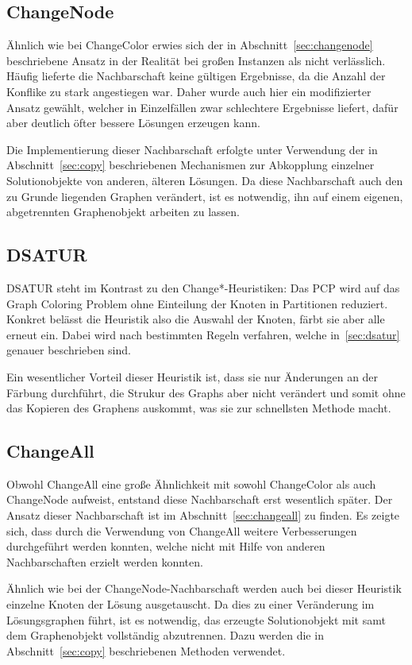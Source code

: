 \subsection{ChangeNode}
Ähnlich wie bei ChangeColor erwies sich der in Abschnitt~\ref{sec:changenode} beschriebene Ansatz in der Realität bei großen Instanzen als nicht verlässlich. Häufig lieferte die Nachbarschaft keine gültigen
Ergebnisse, da die Anzahl der Konflike zu stark angestiegen war. Daher wurde auch hier ein modifizierter Ansatz gewählt, welcher in Einzelfällen zwar schlechtere Ergebnisse liefert, dafür aber deutlich öfter
bessere Lösungen erzeugen kann.

Die Implementierung dieser Nachbarschaft erfolgte unter Verwendung der in Abschnitt~\ref{sec:copy} beschriebenen Mechanismen zur Abkopplung einzelner Solutionobjekte von anderen, älteren Lösungen. Da diese 
Nachbarschaft auch den zu Grunde liegenden Graphen verändert, ist es notwendig, ihn auf einem eigenen, abgetrennten Graphenobjekt arbeiten zu lassen. 

\subsection{DSATUR}
DSATUR steht im Kontrast zu den Change*-Heuristiken: Das PCP wird auf das Graph Coloring Problem ohne Einteilung der Knoten in Partitionen reduziert. Konkret belässt die Heuristik also die Auswahl der Knoten, färbt sie aber alle erneut ein. Dabei wird nach be\-stim\-mt\-en Regeln verfahren, welche in~\ref{sec:dsatur} genauer beschrieben sind.

Ein wesentlicher Vorteil dieser Heuristik ist, dass sie nur Änderungen an der Färbung durchführt, die Strukur des Graphs aber nicht verändert und somit ohne das Kopieren des Graphens auskommt, was sie zur schnellsten Methode macht.

\subsection{ChangeAll}
Obwohl ChangeAll eine große Ähnlichkeit mit sowohl ChangeColor als auch ChangeNode aufweist, entstand diese Nachbarschaft erst wesentlich später. Der Ansatz dieser Nachbarschaft ist im Abschnitt~\ref{sec:changeall} zu finden.
Es zeigte sich, dass durch die Verwendung von ChangeAll weitere Verbesserungen durchgeführt werden konnten, welche nicht mit Hilfe von anderen 
Nachbarschaften erzielt werden konnten.

Ähnlich wie bei der ChangeNode-Nachbarschaft werden auch bei dieser Heuristik einzelne Knoten der Lösung ausgetauscht. Da dies zu einer Veränderung im Lösungsgraphen führt, ist es notwendig, das erzeugte
Solutionobjekt mit samt dem Graphenobjekt vollständig abzutrennen. Dazu werden die in Abschnitt~\ref{sec:copy} beschriebenen Methoden verwendet.

